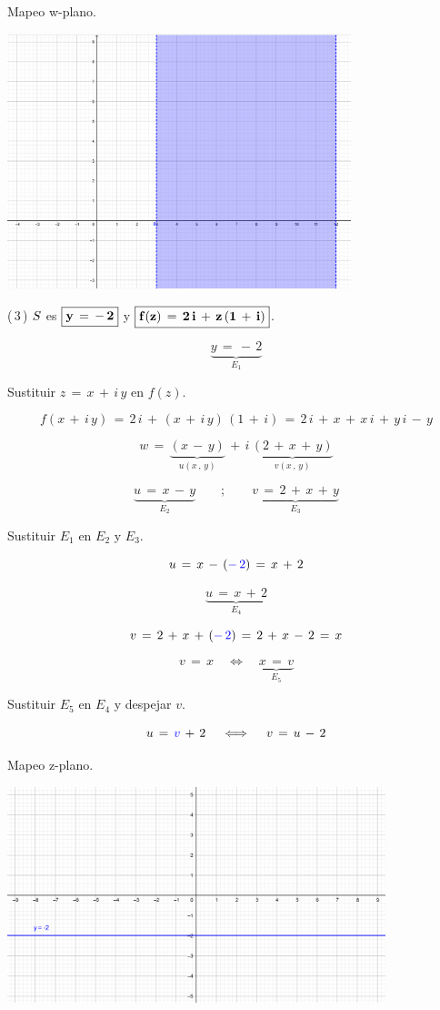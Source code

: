 \documentclass[a4paper,11pt,openany]{book}
\begin{document}
\textcolor{ao(english)}{} Mapeo w-plano.

\begin{center}
     \includegraphics[width=10cm]{Mapeo-Ej-2-w}
\end{center}

\textcolor{ao(english)}{(\,3\,)} $\mathnormal{S}$ es $\boxed{\bf{y\,=\,-\,2}}$ y $\boxed{\bf{f(z)\,=\,2\,i\,+\,z\,(1\,+\,i)}}$.

$$\underbrace{y\,=\,-\,2}_{E_{1}}$$

\textcolor{ao(english)}{} Sustituir $z\,=\,x\,+\,i\,y$ en $f(z)$.

$$f(x\,+\,i\,y)\,=\,2\,i\,+\,(x\,+\,i\,y)\,(1\,+\,i)\,=\,2\,i\,+\,x\,+\,x\,i\,+\,y\,i\,-\,y$$

$$w\,=\,\underbrace{(x\,-\,y)}_{u(x\,,\,y)}\,+\,i\,\underbrace{(2\,+\,x\,+\,y)}_{v(x\,,\,y)}$$

$$\underbrace{u\,=\,x\,-\,y}_{E_{2}} \qquad;\qquad \underbrace{v\,=\,2\,+\,x\,+\,y}_{E_{3}}$$

\textcolor{ao(english)}{} Sustituir $E_{1}$ en $E_{2}$ y $E_{3}$.

$$u\,=\,x\,-\,(\textcolor{ao}{-\,2})\,=\,x\,+\,2$$

$$\underbrace{u\,=\,x\,+\,2}_{E_{4}}$$

$$v\,=\,2\,+\,x\,+\,(\textcolor{ao}{-\,2})\,=\,2\,+\,x\,-\,2\,=\,x$$

$$v\,=\,x \quad\iff\quad \underbrace{x\,=\,v}_{E_{5}}$$

\textcolor{ao(english)}{} Sustituir $E_{5}$ en $E_{4}$ y despejar $v$.

$$u\,=\,\textcolor{ao}{v}\,+\,2 \quad\iff\quad v\,=\,u\,-\,2$$

\textcolor{ao(english)}{} Mapeo z-plano.

\begin{center}
     \includegraphics[width=11cm]{Mapeo-Ej-3-z.png}
\end{center}
\end{document}

